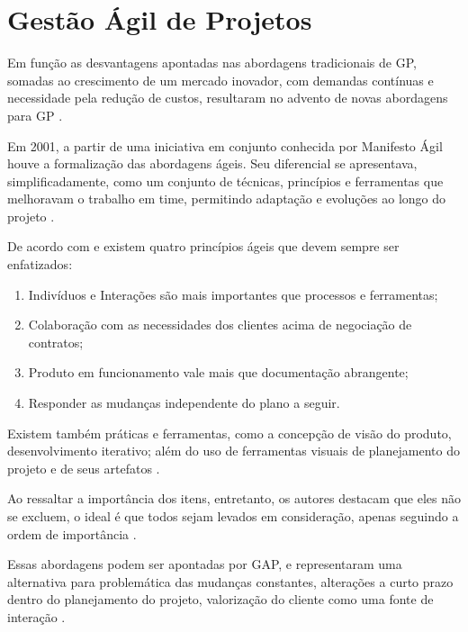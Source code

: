 \section{Gestão Ágil de Projetos}

Em função as desvantagens apontadas nas abordagens tradicionais de GP, somadas ao crescimento de um mercado inovador, com demandas contínuas e necessidade pela redução de custos, resultaram no advento de novas abordagens para GP \cite{aguanno2004101, amaral2011gerenciamento, williams2005assessing}.

Em 2001, a partir de uma iniciativa em conjunto conhecida por Manifesto Ágil houve a formalização das abordagens ágeis. Seu diferencial se apresentava, simplificadamente, como um conjunto de técnicas, princípios e ferramentas que melhoravam o trabalho em time, permitindo adaptação e evoluções ao longo do projeto \cite{beck2001manifesto, berggren2008rethinking, cohn2005agile, hass2007blending, highsmith2009agile, fernandez2008agile, fitsilis2008comparing, larman2003iterative, schwaber2004agile, smith2007flexible, qumer2010empirical}.

De acordo com  e  existem quatro princípios ágeis que devem sempre ser enfatizados:

\begin{enumerate}
    \item{Indivíduos e Interações são mais importantes que processos e ferramentas;}
    \item{Colaboração com as necessidades dos clientes acima de negociação de contratos;}
    \item{Produto em funcionamento vale mais que documentação abrangente;}
    \item{Responder as mudanças independente do plano a seguir.}
\end{enumerate}

Existem também práticas e ferramentas, como a concepção de visão do produto, desenvolvimento iterativo; além do uso de ferramentas visuais de planejamento do projeto e de seus artefatos \cite{augustine2005managing, boehm2004balancing, chin2004agile, highsmith2009agile}.

Ao ressaltar a importância dos itens, entretanto, os autores destacam que eles não se excluem, o ideal é que todos sejam levados em consideração, apenas seguindo a ordem de importância \cite{aguanno2004101}.

Essas abordagens podem ser apontadas por GAP, e representaram uma alternativa para problemática das mudanças constantes, alterações a curto prazo dentro do planejamento do projeto, valorização do cliente como uma fonte de interação \cite{amaral2011gerenciamento, augustine2005managing, cohn2005agile, highsmith2009agile}.

